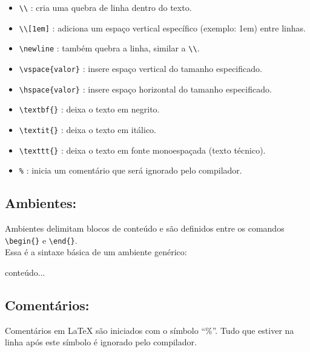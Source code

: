 \documentclass{article}
\begin{document}
\begin{itemize}
	\item \texttt{\textbackslash\textbackslash} : cria uma quebra de linha dentro do texto.
	\item \texttt{\textbackslash\textbackslash[1em]} : adiciona um espaço vertical específico (exemplo: 1em) entre linhas.
	\item \texttt{\textbackslash newline} : também quebra a linha, similar a \texttt{\textbackslash\textbackslash}.
	\item \texttt{\textbackslash vspace\{valor\}} : insere espaço vertical do tamanho especificado.
	\item \texttt{\textbackslash hspace\{valor\}} : insere espaço horizontal do tamanho especificado.
	\item \texttt{\textbackslash textbf\{\}} : deixa o texto em negrito.
	\item \texttt{\textbackslash textit\{\}} : deixa o texto em itálico.
	\item \texttt{\textbackslash texttt\{\}} : deixa o texto em fonte monoespaçada (texto técnico).
	\item \texttt{\%} : inicia um comentário que será ignorado pelo compilador.
\end{itemize}

\subsection{Ambientes:}

Ambientes delimitam blocos de conteúdo e são definidos entre os comandos \texttt{\textbackslash begin\{\}} e \texttt{\textbackslash end\{\}}. \\

Essa é a sintaxe básica de um ambiente genérico:

\begin{teX}
	\begin{ambiente}      %
	conteúdo...
	\end{ambiente}         %
\end{teX}

\subsection{Comentários:}

Comentários em LaTeX são iniciados com o símbolo ``\%''. Tudo que estiver na linha após este símbolo é ignorado pelo compilador.
\end{document}
